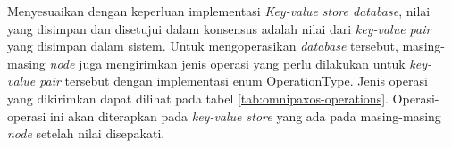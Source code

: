 Menyesuaikan dengan keperluan implementasi \textit{Key-value store database}, nilai yang disimpan dan disetujui dalam konsensus adalah nilai dari \textit{key-value pair} yang disimpan dalam sistem. Untuk mengoperasikan \textit{database} tersebut, masing-masing \textit{node} juga mengirimkan jenis operasi yang perlu dilakukan untuk \textit{key-value pair} tersebut dengan implementasi enum OperationType. Jenis operasi yang dikirimkan dapat dilihat pada tabel \ref{tab:omnipaxos-operations}. Operasi-operasi ini akan diterapkan pada \textit{key-value store} yang ada pada masing-masing \textit{node} setelah nilai disepakati.

\begin{table}[h]
    \centering
    \caption{Jenis Operasi untuk Pesan Database}
    \label{tab:omnipaxos-operations}
\end{table}


